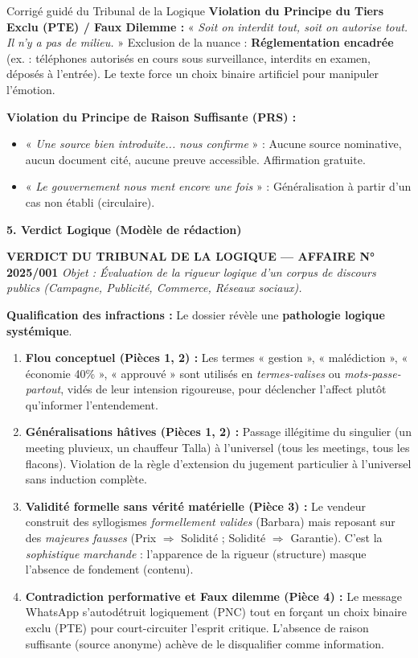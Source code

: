 \documentclass[11pt]{article}
\begin{document}
\begin{exoresolu}{Corrigé guidé du Tribunal de la Logique}
\vspace{0.3em}
\noindent\textbf{Violation du Principe du Tiers Exclu (PTE) / Faux Dilemme :}
« \emph{Soit on interdit tout, soit on autorise tout. Il n'y a pas de milieu.} »
Exclusion de la nuance : \textbf{Réglementation encadrée} (ex. : téléphones autorisés en cours sous surveillance, interdits en examen, déposés à l'entrée). Le texte force un choix binaire artificiel pour manipuler l'émotion.

\vspace{0.3em}
\noindent\textbf{Violation du Principe de Raison Suffisante (PRS) :}
\begin{itemize}
    \item « \emph{Une source bien introduite... nous confirme} » : Aucune source nominative, aucun document cité, aucune preuve accessible. Affirmation gratuite.
    \item « \emph{Le gouvernement nous ment encore une fois} » : Généralisation à partir d'un cas non établi (circulaire).
\end{itemize}

\vspace{0.5em}
\noindent\textbf{5. Verdict Logique (Modèle de rédaction)}

\vspace{0.3em}
\noindent\textbf{VERDICT DU TRIBUNAL DE LA LOGIQUE — AFFAIRE N° 2025/001}
\textit{Objet : Évaluation de la rigueur logique d'un corpus de discours publics (Campagne, Publicité, Commerce, Réseaux sociaux).}

\textbf{Qualification des infractions :}
Le dossier révèle une \textbf{pathologie logique systémique}.
\begin{enumerate}
    \item \textbf{Flou conceptuel (Pièces 1, 2) :} Les termes « gestion », « malédiction », « économie 40\% », « approuvé » sont utilisés en \emph{termes-valises} ou \emph{mots-passe-partout}, vidés de leur intension rigoureuse, pour déclencher l'affect plutôt qu'informer l'entendement.
    \item \textbf{Généralisations hâtives (Pièces 1, 2) :} Passage illégitime du singulier (un meeting pluvieux, un chauffeur Talla) à l'universel (tous les meetings, tous les flacons). Violation de la règle d'extension du jugement particulier à l'universel sans induction complète.
    \item \textbf{Validité formelle sans vérité matérielle (Pièce 3) :} Le vendeur construit des syllogismes \emph{formellement valides} (Barbara) mais reposant sur des \emph{majeures fausses} (Prix $\Rightarrow$ Solidité ; Solidité $\Rightarrow$ Garantie). C'est la \emph{sophistique marchande} : l'apparence de la rigueur (structure) masque l'absence de fondement (contenu).
    \item \textbf{Contradiction performative et Faux dilemme (Pièce 4) :} Le message WhatsApp s'autodétruit logiquement (PNC) tout en forçant un choix binaire exclu (PTE) pour court-circuiter l'esprit critique. L'absence de raison suffisante (source anonyme) achève de le disqualifier comme information.
\end{enumerate}


\end{exoresolu}
\end{document}
